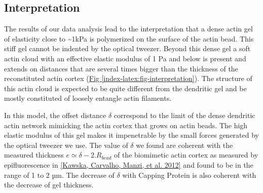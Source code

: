 \documentclass[A4paperpaper,11pt,english]{sphinxmanual}
\begin{document}
\subsection{Interpretation}
\label{index-latex:interpretation}
The results of our data analysis lead to the interpretation that
a dense actin gel of elasticity close to \textasciitilde{}1kPa is polymerized
on the surface of the actin bead. This stiff gel
cannot be indented by the optical tweezer. Beyond this dense gel a soft
actin cloud with an effective elastic modulus of 1 Pa and below is
present and extends on distances that are several times bigger than the thickness
of the reconstituted actin cortex (\hyperref[index-latex:fig-interpretation]{Fig  \ref*{index-latex:fig-interpretation}}). The
structure of this actin cloud is expected to be quite different from the
dendritic gel and be mostly constituted of loosely entangle actin filaments.

In this model, the offset distance \(\delta\) correspond to the limit of the dense
dendritic actin network mimicking the actin cortex that grows on actin beads.
The high elastic modulus of this gel makes it impenetrable by the small forces generated by the optical tweezer we use. The
value of \(\delta\) we found are coherent with the measured thickness \(e
\simeq \delta - 2.R_{bead}\) of the  biomimetic actin cortex as measured by
epifluorescence in {\hyperref[index-latex:kawska2012]{{[}Kawska, Carvalho, Manzi,  et al.  2012{]}}} and found to be in the range of 1 to 2 µm. The decrease
of \(\delta\) with Capping Protein is also coherent with the decrease of gel
thickness.
\end{document}

